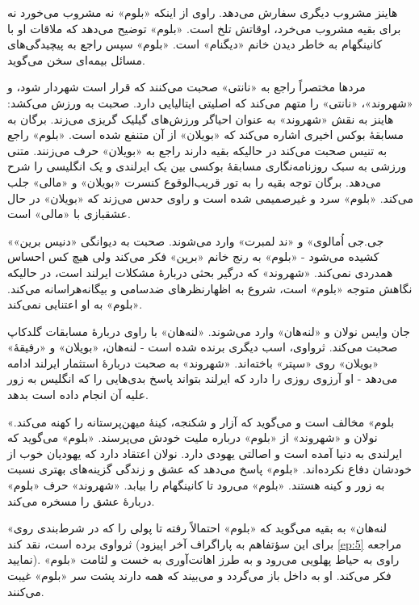 \documentclass[12pt]{book}
\newcommand{\noun}[1]{«{#1}»}
\begin{document}
    هاینز مشروب دیگری سفارش می‌دهد. راوی از اینکه \noun{بلوم} نه مشروب می‌خورد نه برای بقیه مشروب می‌خرد، اوقاتش تلخ است. \noun{بلوم} توضیح می‌دهد که ملاقات او با کانینگهام به خاطر دیدن خانم \noun{دیگنام} است. \noun{بلوم} سپس راجع به پیچیدگی‌های مسائل بیمه‌ای سخن می‌گوید.

    مردها مختصراً راجع به \noun{نانتی} صحبت می‌کنند که قرار است شهردار شود، و \noun{شهروند‬}، \noun{نانتی} را متهم می‌کند که اصلیتی ایتالیایی دارد. صحبت به ورزش می‌کشد: هاینز به نقش \noun{شهروند‬} به عنوان احیاگر ورزش‌های گیلیک گریزی می‌زند. برگان به مسابقۀ بوکس اخیری اشاره می‌کند که \noun{بویلان} از آن متنفع شده است. \noun{بلوم} راجع به تنیس صحبت می‌کند در حالیکه بقیه دارند راجع به \noun{بویلان} حرف می‌زنند. متنی ورزشی به سبک روزنامه‌نگاری مسابقۀ بوکسی بین یک ایرلندی و یک انگلیسی را شرح می‌دهد. برگان توجه بقیه را به تور قریب‌الوقوع کنسرت \noun{بویلان} و \noun{مالی} جلب می‌کند. \noun{بلوم} سرد و غیرصمیمی شده است و راوی حدس می‌زند که \noun{بویلان} در حال عشقبازی با \noun{مالی} است.

    \noun{جی.جی اُمالوی} و \noun{ند لمبرت} وارد می‌شوند. صحبت به دیوانگی \noun{دنیس برین} کشیده می‌شود - \noun{بلوم} به رنج خانم \noun{برین} فکر می‌کند ولی هیچ کس احساس همدردی نمی‌کند. \noun{شهروند‬} که درگیر بحثی دربارۀ مشکلات ایرلند است، در حالیکه نگاهش متوجه \noun{بلوم} است، شروع به اظهارنظرهای ضدسامی و بیگانه‌هراسانه می‌کند. \noun{بلوم} به او اعتنایی نمی‌کند.

    جان وایس نولان و \noun{لنه‌هان} وارد می‌شوند. \noun{لنه‌هان} با راوی دربارۀ مسابقات گلدکاپ صحبت می‌کند. ثرواوی، اسب دیگری برنده شده است - لنه‌هان، \noun{بویلان} و «رفیقۀ» \noun{بویلان} روی \noun{سپتر} باخته‌اند. \noun{شهروند‬} به صحبت دربارۀ استثمار ایرلند ادامه می‌دهد - او آرزوی روزی را دارد که ایرلند بتواند پاسخ بدی‌هایی را که انگلیس به زور علیه آن انجام داده است بدهد.

    \noun{بلوم} مخالف است و می‌گوید که آزار و شکنجه، کینۀ میهن‌پرستانه را کهنه می‌کند. نولان و \noun{شهروند‬} از \noun{بلوم} درباره ملیت خودش می‌پرسند. \noun{بلوم} می‌گوید که ایرلندی به دنیا آمده است و اصالتی یهودی دارد. نولان اعتقاد دارد که یهودیان خوب از خودشان دفاع نکرده‌اند. \noun{بلوم} پاسخ می‌دهد که عشق و زندگی گزینه‌های بهتری نسبت به زور و کینه هستند. \noun{بلوم} می‌رود تا کانینگهام را بیابد. \noun{شهروند‬} حرف \noun{بلوم} دربارۀ عشق را مسخره می‌کند.

   \noun{لنه‌هان} به بقیه می‌گوید که \noun{بلوم} احتمالاً رفته تا پولی را که در شرط‌بندی روی ثرواوی برده است، نقد کند (برای این سؤتفاهم به پاراگراف آخر اپیزود \ref{ep:5} مراجعه نمایید). راوی به حیاط پهلویی می‌رود و به طرز اهانت‌آوری به خست و لئامت \noun{بلوم} فکر می‌کند. او به داخل باز می‌گردد و می‌بیند که همه دارند پشت سر \noun{بلوم} غیبت می‌کنند.
\end{document}
